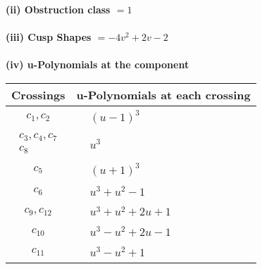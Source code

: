 \documentclass[1p]{elsarticle_modified}
\theoremstyle{definition}
\begin{document}
\flushleft \textbf{(ii) Obstruction class $= 1$}\\~\\
\flushleft \textbf{(iii) Cusp Shapes $= -4 v^2+2 v-2$}\\~\\
\newpage\renewcommand{\arraystretch}{1}
\flushleft \textbf{(iv) u-Polynomials at the component}\newline \\
\begin{tabular}{m{50pt}|m{274pt}}
Crossings & \hspace{64pt}u-Polynomials at each crossing \\
\hline $$\begin{aligned}c_{1},c_{2}\end{aligned}$$&$\begin{aligned}
&(u-1)^3
\end{aligned}$\\
\hline $$\begin{aligned}c_{3},c_{4},c_{7}\\c_{8}\end{aligned}$$&$\begin{aligned}
&u^3
\end{aligned}$\\
\hline $$\begin{aligned}c_{5}\end{aligned}$$&$\begin{aligned}
&(u+1)^3
\end{aligned}$\\
\hline $$\begin{aligned}c_{6}\end{aligned}$$&$\begin{aligned}
&u^3+u^2-1
\end{aligned}$\\
\hline $$\begin{aligned}c_{9},c_{12}\end{aligned}$$&$\begin{aligned}
&u^3+u^2+2 u+1
\end{aligned}$\\
\hline $$\begin{aligned}c_{10}\end{aligned}$$&$\begin{aligned}
&u^3- u^2+2 u-1
\end{aligned}$\\
\hline $$\begin{aligned}c_{11}\end{aligned}$$&$\begin{aligned}
&u^3- u^2+1
\end{aligned}$\\
\hline
\end{tabular}\\~\\
\end{document}

